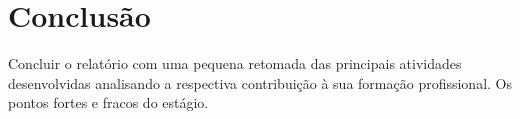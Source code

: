 \chapter{Conclusão}
\label{cap:conclusao}

Concluir o relatório com uma pequena retomada das principais atividades desenvolvidas analisando a respectiva contribuição à sua formação profissional. Os pontos fortes e fracos do estágio.